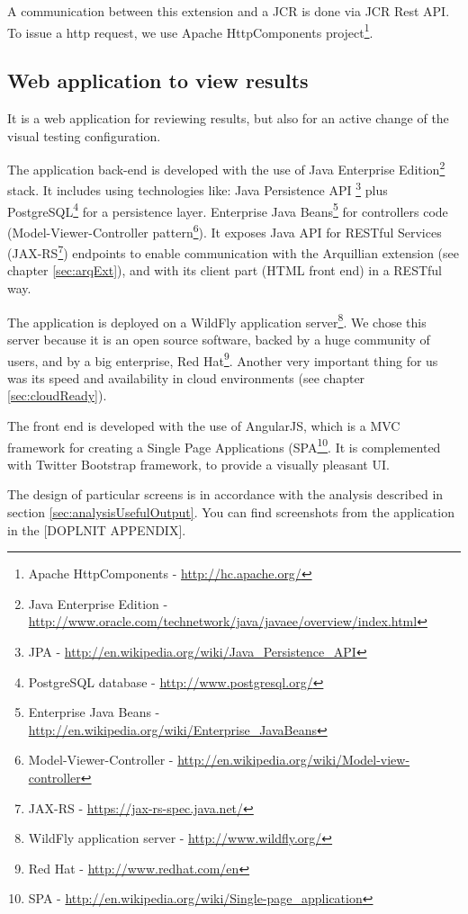 \documentclass[11pt,oneside,final]{fithesis2}
\begin{document}
    A communication between this extension and a JCR is done via JCR Rest API. To issue a http request, we use Apache HttpComponents
    project\footnote{Apache HttpComponents - \url{http://hc.apache.org/}}.
 
    \subsection{Web application to view results}
    \label{sec:webManagerAppDesc}
    It is a web application for reviewing results, but also for an active change
    of the visual testing configuration.
    
    The application back-end is developed with the use of Java Enterprise Edition\footnote{Java Enterprise Edition - 
    \url{http://www.oracle.com/technetwork/java/javaee/overview/index.html}} stack.
    It includes using technologies like: Java Persistence API 
    \footnote{JPA - \url{http://en.wikipedia.org/wiki/Java_Persistence_API}} plus 
    PostgreSQL\footnote{PostgreSQL database - \url{http://www.postgresql.org/}} for a persistence
    layer. Enterprise Java Beans\footnote{Enterprise Java Beans - \url{http://en.wikipedia.org/wiki/Enterprise_JavaBeans}} 
    for controllers code (Model-Viewer-Controller 
    pattern\footnote{Model-Viewer-Controller - \url{http://en.wikipedia.org/wiki/Model-view-controller}}).
    It exposes Java API for RESTful Services (JAX-RS\footnote{JAX-RS - \url{https://jax-rs-spec.java.net/}}) endpoints to
    enable communication with the Arquillian extension (see chapter \ref{sec:arqExt}), and with its client part (HTML front end) in a
    RESTful way.
    
    The application is deployed on a WildFly application server\footnote{WildFly application server - \url{http://www.wildfly.org/}}.
    We chose this server because it is an open source software, backed by a huge community of users, and by a big enterprise,
    Red Hat\footnote{Red Hat - \url{http://www.redhat.com/en}}. Another very important thing for us was its speed and availability in
    cloud environments (see chapter \ref{sec:cloudReady}).
    
    The front end is developed with the use of AngularJS, which is a MVC framework for creating a Single Page Applications 
    (SPA\footnote{SPA - \url{http://en.wikipedia.org/wiki/Single-page_application}}. It is complemented with Twitter Bootstrap
    framework, to provide a visually pleasant UI.
    
    The design of particular screens is in accordance with the analysis described in section \ref{sec:analysisUsefulOutput}.
    You can find screenshots from the application in the [DOPLNIT APPENDIX].
    
\end{document}
